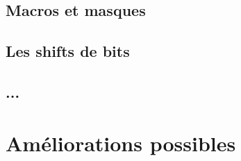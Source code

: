 \documentclass[a4paper]{article}
\begin{document}
\subsection{Macros et masques}








\subsection{Les shifts de bits}








\subsection{...}













\section{Améliorations possibles}



\end{document}
